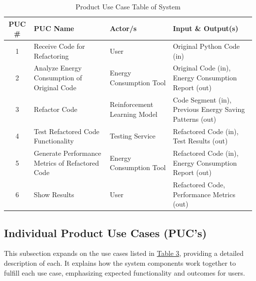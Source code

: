 \documentclass[12pt]{article}
\begin{document}
\begin{table}[H]
  \centering
  \begin{tabularx}{\textwidth}{|c|
    >{\raggedright\arraybackslash}X|
    >{\raggedright\arraybackslash}p{1.2in}|
    >{\raggedright\arraybackslash}X|}
    \toprule \textbf{PUC \#} & \textbf{PUC Name} & \textbf{Actor/s} & \textbf{Input \& Output(s)} \\
    \midrule
    1 & Receive Code for Refactoring & User & Original Python Code (in) \\ 
    2 & Analyze Energy Consumption of Original Code & Energy Consumption Tool & Original Code (in), Energy Consumption Report (out) \\ 
    3 & Refactor Code & Reinforcement Learning Model & Code Segment (in), Previous Energy Saving Patterns (out) \\ 
    4 & Test Refactored Code Functionality & Testing Service & Refactored Code (in), Test Results (out) \\ 
    5 & Generate Performance Metrics of Refactored Code & Energy Consumption Tool & Refactored Code (in), Energy Consumption Report (out) \\ 
    6 & Show Results & User & Refactored Code, Performance Metrics (out) \\
    \bottomrule
  \end{tabularx}
  \caption{Product Use Case Table of System}
  \label{tab:puc}
\end{table}

\subsection{Individual Product Use Cases (PUC's)}
This subsection expands on the use cases listed in \hyperref[tab:puc]{Table 3}, providing a detailed description of each. It explains how the system components work together to fulfill each use case, emphasizing expected functionality and outcomes for users.
\end{document}
